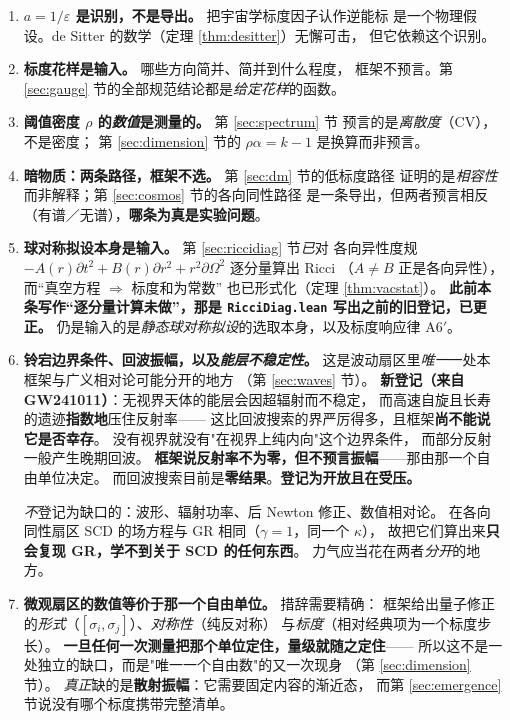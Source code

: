 \documentclass[11pt,a4paper]{article}
\theoremstyle{sudef}
\newcommand{\dd}{\partial}
\begin{document}
\begin{enumerate}[leftmargin=1.8em,itemsep=3pt]
\item \textbf{$a=1/\varepsilon$ 是识别，不是导出。} 把宇宙学标度因子认作逆能标
      是一个物理假设。de Sitter 的数学（定理 \ref{thm:desitter}）无懈可击，
      但它依赖这个识别。
\item \textbf{标度花样是输入。} 哪些方向简并、简并到什么程度，
      框架不预言。第 \ref{sec:gauge} 节的全部规范结论都是\emph{给定花样}的函数。
\item \textbf{阈值密度 $\rho$ 的\emph{数值}是测量的。} 第 \ref{sec:spectrum} 节
      预言的是\emph{离散度}（$\mathrm{CV}$），不是密度；
      第 \ref{sec:dimension} 节的 $\rho\alpha=k-1$ 是换算而非预言。
\item \textbf{暗物质：两条路径，框架不选。} 第 \ref{sec:dm} 节的低标度路径
      证明的是\emph{相容性}而非解释；第 \ref{sec:cosmos} 节的各向同性路径
      是一条导出，但两者预言相反（有谱／无谱），\textbf{哪条为真是实验问题}。
\item \textbf{球对称拟设本身是输入。} 第 \ref{sec:riccidiag} 节\emph{已}对
      各向异性度规 $-A(r)\dd t^2+B(r)\dd r^2+r^2\dd\Omega^2$ 逐分量算出 Ricci
      （$A\neq B$ 正是各向异性），而“真空方程 $\Rightarrow$ 标度和为常数”
      也已形式化（定理 \ref{thm:vacstat}）。
      \textbf{此前本条写作“逐分量计算未做”，那是 \texttt{RicciDiag.lean} 写出之前的旧登记，已更正。}
      仍是输入的是\emph{静态球对称拟设}的选取本身，以及标度响应律 A6$'$。
\item \textbf{铃宕边界条件、回波振幅，以及\emph{能层不稳定性}。}
      这是波动扇区里\emph{唯一}一处本框架与广义相对论可能分开的地方
      （第 \ref{sec:waves} 节）。
      \textbf{新登记（来自 GW241011）}：无视界天体的能层会因超辐射而不稳定，
      而高速自旋且长寿的遗迹\textbf{指数地}压住反射率——
      这比回波搜索的界严厉得多，且框架\textbf{尚不能说它是否幸存}。
      没有视界就没有"在视界上纯内向"这个边界条件，
      而部分反射一般产生晚期回波。
      \textbf{框架说反射率不为零，但不预言振幅}——那由那一个自由单位决定。
      而回波搜索目前是\textbf{零结果}。\textbf{登记为开放且在受压。}

      \emph{不}登记为缺口的：波形、辐射功率、后 Newton 修正、数值相对论。
      在各向同性扇区 SCD 的场方程与 GR 相同（$\gamma=1$，同一个 $\kappa$），
      故把它们算出来\textbf{只会复现 GR，学不到关于 SCD 的任何东西}。
      力气应当花在两者\emph{分开}的地方。
\item \textbf{微观扇区的数值等价于那一个自由单位。} 措辞需要精确：
      框架给出量子修正的\emph{形式}（$[\sigma_i,\sigma_j]$）、\emph{对称性}（纯反对称）
      与\emph{标度}（相对经典项为一个标度步长）。
      \textbf{一旦任何一次测量把那个单位定住，量级就随之定住}——
      所以这不是一处独立的缺口，而是"唯一一个自由数"的又一次现身
      （第 \ref{sec:dimension} 节）。
      \emph{真正}缺的是\textbf{散射振幅}：它需要固定内容的渐近态，
      而第 \ref{sec:emergence} 节说没有哪个标度携带完整清单。
\end{enumerate}
\end{document}

